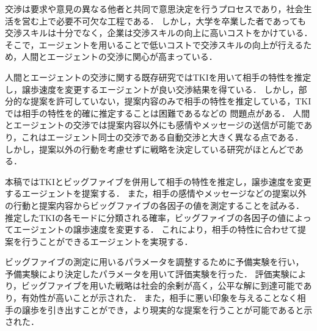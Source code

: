 
交渉は要求や意見の異なる他者と共同で意思決定を行うプロセスであり，社会生活を営む上で必要不可欠な工程である．
しかし，大学を卒業した者であっても交渉スキルは十分でなく，企業は交渉スキルの向上に高いコストをかけている．
そこで，エージェントを用いることで低いコストで交渉スキルの向上が行えるため，人間とエージェントの交渉に関心が高まっている．

人間とエージェントの交渉に関する既存研究ではTKIを用いて相手の特性を推定し，譲歩速度を変更するエージェントが良い交渉結果を得ている．
しかし，部分的な提案を許可していない，提案内容のみで相手の特性を推定している，TKIでは相手の特性を的確に推定することは困難であるなどの
問題点がある．
人間とエージェントの交渉では提案内容以外にも感情やメッセージの送信が可能であり，これはエージェント同士の交渉である自動交渉と大きく異なる点である．
しかし，提案以外の行動を考慮せずに戦略を決定している研究がほとんどである．

本稿ではTKIとビッグファイブを併用して相手の特性を推定し，譲歩速度を変更するエージェントを提案する．
また，相手の感情やメッセージなどの提案以外の行動と提案内容からビッグファイブの各因子の値を測定することを試みる．
推定したTKIの各モードに分類される確率，ビッグファイブの各因子の値によってエージェントの譲歩速度を変更する．
これにより，相手の特性に合わせて提案を行うことができるエージェントを実現する．

ビッグファイブの測定に用いるパラメータを調整するために予備実験を行い，
予備実験により決定したパラメータを用いて評価実験を行った．
評価実験により，ビッグファイブを用いた戦略は社会的余剰が高く，公平な解に到達可能であり，有効性が高いことが示された．
また，相手に悪い印象を与えることなく相手の譲歩を引き出すことができ，より現実的な提案を行うことが可能であると示された．

